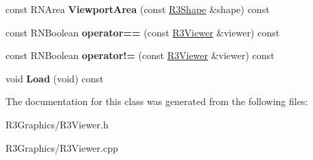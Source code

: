 \begin{DoxyCompactItemize}
\item 
const R\+N\+Area {\bfseries Viewport\+Area} (const \hyperlink{class_r3_shape}{R3\+Shape} \&shape) const \hypertarget{class_r3_viewer_a4a96bb96eb0b6ac3e296c202fc4417a5}{}\label{class_r3_viewer_a4a96bb96eb0b6ac3e296c202fc4417a5}

\item 
const R\+N\+Boolean {\bfseries operator==} (const \hyperlink{class_r3_viewer}{R3\+Viewer} \&viewer) const \hypertarget{class_r3_viewer_a0d5d9f83027c222aa7aa21ecf482f045}{}\label{class_r3_viewer_a0d5d9f83027c222aa7aa21ecf482f045}

\item 
const R\+N\+Boolean {\bfseries operator!=} (const \hyperlink{class_r3_viewer}{R3\+Viewer} \&viewer) const \hypertarget{class_r3_viewer_a4816d7289f4a04c36887caa5dc07a53f}{}\label{class_r3_viewer_a4816d7289f4a04c36887caa5dc07a53f}

\item 
void {\bfseries Load} (void) const \hypertarget{class_r3_viewer_a15b28c5eb1ba0bb0e6aeb58f15c62951}{}\label{class_r3_viewer_a15b28c5eb1ba0bb0e6aeb58f15c62951}

\end{DoxyCompactItemize}


The documentation for this class was generated from the following files\+:\begin{DoxyCompactItemize}
\item 
R3\+Graphics/R3\+Viewer.\+h\item 
R3\+Graphics/R3\+Viewer.\+cpp\end{DoxyCompactItemize}
